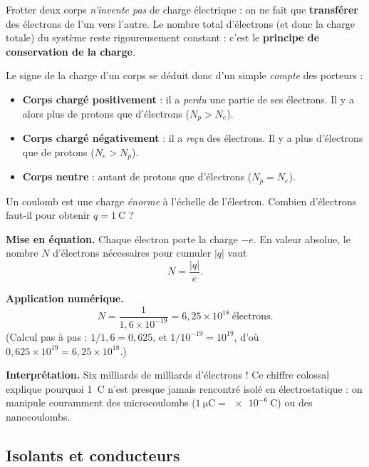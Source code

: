 \documentclass[11pt,a4paper]{article}
\begin{document}
\begin{attention}
Frotter deux corps \emph{n'invente pas} de charge électrique : on ne fait que \textbf{transférer}
des électrons de l'un vers l'autre. Le nombre total d'électrons (et donc la charge totale) du
système reste rigoureusement constant : c'est le \textbf{principe de conservation de la charge}.
\end{attention}

Le signe de la charge d'un corps se déduit donc d'un simple \emph{compte} des porteurs :

\begin{itemize}[leftmargin=1.6em,topsep=2pt,itemsep=2pt]
  \item \textbf{Corps chargé positivement} : il a \emph{perdu} une partie de ses électrons.
        Il y a alors plus de protons que d'électrons ($N_p > N_e$).
  \item \textbf{Corps chargé négativement} : il a \emph{reçu} des électrons.
        Il y a plus d'électrons que de protons ($N_e > N_p$).
  \item \textbf{Corps neutre} : autant de protons que d'électrons ($N_p = N_e$).
\end{itemize}

\begin{exemple}
Un coulomb est une charge \emph{énorme} à l'échelle de l'électron. Combien d'électrons faut-il pour
obtenir $q = \SI{1}{\coulomb}$ ?

\smallskip
\textbf{Mise en équation.} Chaque électron porte la charge $-e$. En valeur absolue, le nombre $N$
d'électrons nécessaires pour cumuler $|q|$ vaut
\[ N = \frac{|q|}{e}. \]

\textbf{Application numérique.}
\[ N = \frac{1}{1{,}6\times 10^{-19}} = 6{,}25\times 10^{18}\ \text{électrons}. \]
(Calcul pas à pas : $1 / 1{,}6 = 0{,}625$, et $1 / 10^{-19} = 10^{19}$, d'où $0{,}625\times
10^{19} = 6{,}25\times 10^{18}$.)

\textbf{Interprétation.} Six milliards de milliards d'électrons ! Ce chiffre colossal explique
pourquoi \SI{1}{\coulomb} n'est presque jamais rencontré isolé en électrostatique : on manipule
couramment des microcoulombs ($\SI{1}{\micro\coulomb} = \SI{e-6}{\coulomb}$) ou des nanocoulombs.
\end{exemple}

\subsection{Isolants et conducteurs}
\end{document}
